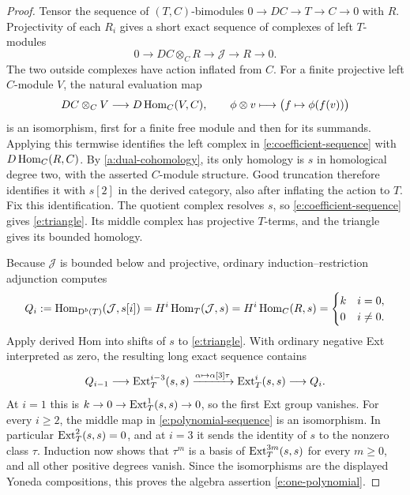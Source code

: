 \begin{proof}
Tensor the sequence of \((T,C)\)-bimodules
\(0\to DC\to T\to C\to0\) with \(R\).  Projectivity of each
\(R_i\) gives a short exact sequence of complexes of left
\(T\)-modules
\begin{equation}
0\longrightarrow DC\otimes_C R
 \longrightarrow\mathcal J\longrightarrow R\longrightarrow0.
\label{e:coefficient-sequence}
\end{equation}
The two outside complexes have action inflated from \(C\).  For a
finite projective left \(C\)-module \(V\), the natural evaluation map
\[
DC\otimes_C V\longrightarrow D\operatorname{Hom}_C(V,C),\qquad
\phi\otimes v\longmapsto\bigl(f\mapsto\phi(f(v))\bigr)
\]
is an isomorphism, first for a finite free module and then for its
summands.  Applying this termwise identifies the left complex in
\eqref{e:coefficient-sequence} with \(D\operatorname{Hom}_C(R,C)\).  By
\eqref{a:dual-cohomology}, its only homology is \(s\) in homological
degree two, with the asserted \(C\)-module structure.  Good truncation
therefore identifies it with \(s[2]\) in the derived category, also
after inflating the action to \(T\).  Fix this identification.
The quotient complex resolves \(s\), so
\eqref{e:coefficient-sequence} gives \eqref{e:triangle}.
Its middle complex has projective \(T\)-terms, and the triangle gives
its bounded homology.

Because \(\mathcal J\) is bounded below and projective, ordinary
induction--restriction adjunction computes
\[
Q_i:=\operatorname{Hom}_{\mathrm D^b(T)}(\mathcal J,s[i])
 =H^i\operatorname{Hom}_T(\mathcal J,s)
 =H^i\operatorname{Hom}_C(R,s)
 =\begin{cases}k&i=0,\\0&i\ne0.\end{cases}
\]
Apply derived Hom into shifts of \(s\) to \eqref{e:triangle}.
With ordinary negative Ext interpreted as zero, the resulting long
exact sequence contains
\begin{equation}
Q_{i-1}\longrightarrow\operatorname{Ext}_T^{i-3}(s,s)
 \xrightarrow{\alpha\mapsto\alpha[3]\tau}
 \operatorname{Ext}_T^i(s,s)\longrightarrow Q_i.
\label{e:polynomial-sequence}
\end{equation}
At \(i=1\) this is \(k\to0\to\operatorname{Ext}_T^1(s,s)\to0\), so the first
Ext group vanishes.  For every \(i\ge2\), the middle map in
\eqref{e:polynomial-sequence} is an isomorphism.  In particular
\(\operatorname{Ext}_T^2(s,s)=0\), and at \(i=3\) it sends the identity of \(s\)
to the nonzero class \(\tau\).  Induction now shows that \(\tau^m\)
is a basis of \(\operatorname{Ext}_T^{3m}(s,s)\) for every \(m\ge0\), and all
other positive degrees vanish.  Since the isomorphisms are the
displayed Yoneda compositions, this proves the algebra assertion
\eqref{e:one-polynomial}.
\end{proof}

